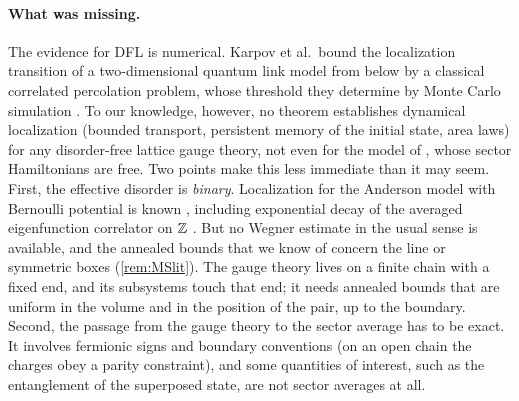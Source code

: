 \paragraph{What was missing.}
The evidence for DFL is numerical.  Karpov et al.\ bound the localization transition of a two-dimensional
quantum link model from below by a classical correlated percolation problem, whose threshold they determine
by Monte Carlo simulation \cite{Karpov2021}.  To our knowledge, however, no theorem establishes dynamical
localization (bounded transport, persistent memory of the initial state, area laws) for any disorder-free
lattice gauge theory, not even for the model of \cite{SKKM2017}, whose sector Hamiltonians are free.  Two
points make this less immediate than it may seem.  First, the effective disorder is \emph{binary}.
Localization for the Anderson model with Bernoulli potential is known \cite{CKM1987,Bucaj2019,JZ2019}, including
exponential decay of the averaged eigenfunction correlator on $\mathbb{Z}$ \cite{GeZhao2020,Macera2023}.  But no Wegner
estimate in the usual sense is available, and the annealed bounds that we know of concern the line or symmetric
boxes (\cref{rem:MSlit}).  The gauge theory lives on a finite chain with a fixed end, and its subsystems touch that
end; it needs annealed bounds that are uniform in the volume and in the position of the pair, up to the
boundary.  Second, the passage from the gauge theory to the sector average has to be exact.  It involves
fermionic signs and boundary conventions (on an open chain the charges obey a parity constraint), and some
quantities of interest, such as the entanglement of the superposed state, are not sector averages at all.

